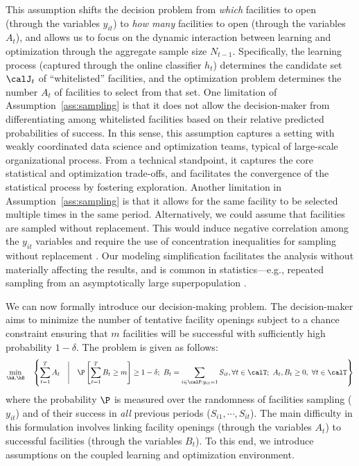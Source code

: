 \documentclass[blindrev]{informs3noheader}
\begin{document}
This assumption shifts the decision problem from \emph{which} facilities to open (through the variables $y_{it}$) to \emph{how many} facilities to open (through the variables $A_t$), and allows us to focus on the dynamic interaction between learning and optimization through the aggregate sample size $N_{t-1}$. Specifically, the learning process (captured through the online classifier $h_t$) determines the candidate set $\calJ_t$ of ``whitelisted'' facilities, and the optimization problem determines the number $A_t$ of facilities to select from that set. One limitation of Assumption~\ref{ass:sampling} is that it does not allow the decision-maker from differentiating among whitelisted facilities based on their relative predicted probabilities of success. In this sense, this assumption captures a setting with weakly coordinated data science and optimization teams, typical of large-scale organizational process. From a technical standpoint, it captures the core statistical and optimization trade-offs, and facilitates the convergence of the statistical process by fostering exploration. Another limitation in Assumption~\ref{ass:sampling} is that it allows for the same facility to be selected multiple times in the same period. Alternatively, we could assume that facilities are sampled without replacement. This would induce negative correlation among the $y_{it}$ variables and require the use of concentration inequalities for sampling without replacement \citep{serfling1974probability, bardenet2015concentration}. Our modeling simplification facilitates the analysis without materially affecting the results, and is common in statistics—e.g., repeated sampling from an asymptotically large superpopulation \citep{Neyman1934,SarndalSwenssonWretman1992}.

We can now formally introduce our decision-making problem. The decision-maker aims to minimize the number of tentative facility openings subject to a chance constraint ensuring that $m$ facilities will be successful with sufficiently high probability $1-\delta$. The problem is given as follows:
\begin{align}\label{prob:original}
\min_{\bA,\bB}\quad \left\{\sum_{t=1}^T A_t\quad\Bigg\rvert\quad\P\left[\sum_{t=1}^TB_t\geq m\right] \geq 1-\delta ;\ B_t=\sum_{i\in\calF:y_{it}=1}S_{it}, \forall t\in\calT;\ A_t,B_t\geq0,\ \forall t\in\calT\right\}
\end{align}
where the probability $\P$ is measured over the randomness of facilities sampling ($y_{it}$) and of their success in \emph{all} previous periods ($S_{i1},\cdots,S_{it}$). The main difficulty in this formulation involves linking facility openings (through the variables $A_t$) to successful facilities (through the variables $B_t$). To this end, we introduce assumptions on the coupled learning and optimization environment.
\end{document}

